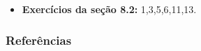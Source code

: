 \documentclass[12pt]{beamer}
\begin{document}
\begin{frame}{\Home}
\begin{block}{}
\justifying

\begin{itemize}
    \item \textbf{Exercícios da seção 8.2:} 1,3,5,6,11,13.
\end{itemize}
\end{block}
\nocite{hogg}
\end{frame}

\begin{frame}[allowframebreaks]
\frametitle{\bf Referências}
\printbibliography
\end{frame}
\end{document}
